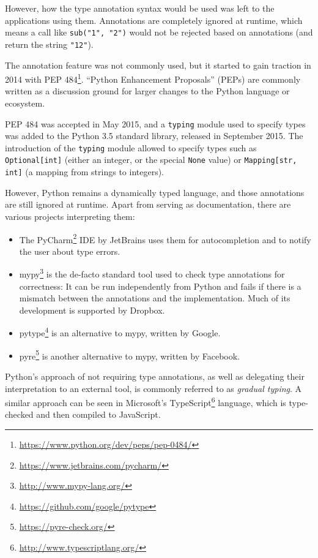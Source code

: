 \documentclass[a4paper,parskip=full,DIV=14,BCOR=15mm]{scrreprt}
\newcommand{\py}[1]{\texttt{#1}}
\begin{document}
However, how the type annotation syntax would be used was left to the
applications using them. Annotations are completely ignored at runtime, which
means a call like \py{sub("1", "2")} would not be rejected based on annotations
(and return the string \py{"12"}).

The annotation feature was not commonly used, but it started to gain traction
in 2014 with PEP 484\footnote{\url{https://www.python.org/dev/peps/pep-0484/}}.
``Python Enhancement Proposals'' (PEPs) are commonly written as a discussion
ground for larger changes to the Python language or ecosystem.

PEP 484 was accepted in May 2015, and a \verb|typing| module used to specify types
was added to the Python 3.5 standard library, released in September 2015. The
introduction of the \verb|typing| module allowed to specify types such as
\py{Optional[int]} (either an integer, or the special \py{None} value) or
\py{Mapping[str, int]} (a mapping from strings to integers).

However, Python remains a dynamically typed language, and those annotations are
still ignored at runtime. Apart from serving as documentation, there are various
projects interpreting them:

\label{typecheck-tools}
\begin{itemize}
  \item The PyCharm\footnote{\url{https://www.jetbrains.com/pycharm/}} IDE by
    JetBrains uses them for autocompletion and to notify the user about type
    errors.
  \item mypy\footnote{\url{http://www.mypy-lang.org/}} is the de-facto standard
    tool used to check type annotations for correctness: It can be run
    independently from Python and fails if there is a mismatch between the
    annotations and the implementation. Much of its development is supported by
    Dropbox.
  \item pytype\footnote{\url{https://github.com/google/pytype}} is an
    alternative to mypy, written by Google.
  \item pyre\footnote{\url{https://pyre-check.org/}} is another alternative
    to mypy, written by Facebook.
\end{itemize}

Python's approach of not requiring type annotations, as well as delegating their
interpretation to an external tool, is commonly referred to as
\emph{gradual typing}. A similar approach can be seen in Microsoft's
TypeScript\footnote{\url{http://www.typescriptlang.org/}} language, which is
type-checked and then compiled to JavaScript.
\end{document}
